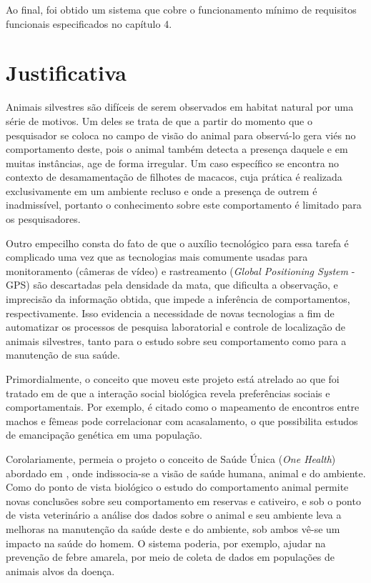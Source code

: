Ao final, foi obtido um sistema que cobre o funcionamento mínimo de requisitos funcionais especificados no capítulo 4.

\section{Justificativa}
Animais silvestres são difíceis de serem observados em habitat natural por uma série de motivos. Um deles se trata de que a partir do momento que o pesquisador se coloca no campo de visão do animal para observá-lo gera viés no comportamento deste, pois o animal também detecta a presença daquele e em muitas instâncias, age de forma irregular. Um caso específico se encontra no contexto de desamamentação de filhotes de macacos, cuja prática é realizada exclusivamente em um ambiente recluso e onde a presença de outrem é inadmissível, portanto o conhecimento sobre este comportamento é limitado para os pesquisadores.

Outro empecilho consta do fato de que o auxílio tecnológico para essa tarefa é complicado uma vez que as tecnologias mais comumente usadas para monitoramento (câmeras de vídeo)  e rastreamento (\emph{Global Positioning System} - GPS) são descartadas pela densidade da mata, que dificulta a observação, e imprecisão da informação obtida, que impede a inferência de comportamentos, respectivamente. Isso evidencia a necessidade de novas tecnologias a fim de automatizar os processos de pesquisa laboratorial e controle de localização de animais silvestres, tanto para o estudo sobre seu comportamento como para a manutenção de sua saúde.

Primordialmente, o conceito que moveu este projeto está atrelado ao que foi tratado em \cite{handcock} de que a interação social biológica revela preferências sociais e comportamentais. Por exemplo, é citado como o mapeamento de encontros entre machos e fêmeas pode correlacionar com acasalamento, o que possibilita estudos de emancipação genética em uma população.

Corolariamente, permeia o projeto o conceito de Saúde Única (\emph{One Health}) abordado em \cite{zinsstag}, onde indissocia-se a visão de saúde humana, animal e do ambiente. Como do ponto de vista biológico o estudo do comportamento animal permite novas conclusões sobre seu comportamento em reservas e cativeiro, e sob o ponto de vista veterinário a análise dos dados sobre o animal e seu ambiente leva a melhoras na manutenção da saúde deste e do ambiente, sob ambos vê-se um impacto na saúde do homem. O sistema poderia, por exemplo, ajudar na prevenção de febre amarela, por meio de coleta de dados em populações de animais alvos da doença.

